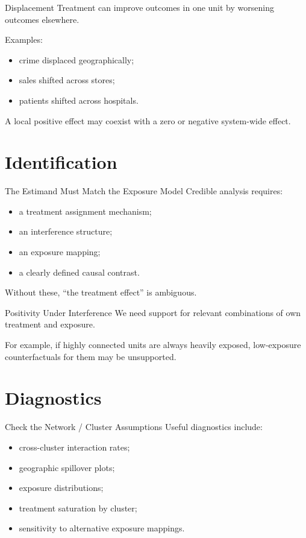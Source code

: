 \documentclass[aspectratio=169,11pt]{beamer}
\begin{document}
\begin{frame}{Displacement}
Treatment can improve outcomes in one unit by worsening outcomes elsewhere.

Examples:
\begin{itemize}
\item crime displaced geographically;
\item sales shifted across stores;
\item patients shifted across hospitals.
\end{itemize}

A local positive effect may coexist with a zero or negative system-wide effect.
\end{frame}

\section{Identification}

\begin{frame}{The Estimand Must Match the Exposure Model}
Credible analysis requires:
\begin{itemize}
\item a treatment assignment mechanism;
\item an interference structure;
\item an exposure mapping;
\item a clearly defined causal contrast.
\end{itemize}

Without these, “the treatment effect” is ambiguous.
\end{frame}

\begin{frame}{Positivity Under Interference}
We need support for relevant combinations of own treatment and exposure.

For example, if highly connected units are always heavily exposed, low-exposure counterfactuals for them may be unsupported.
\end{frame}

\section{Diagnostics}

\begin{frame}{Check the Network / Cluster Assumptions}
Useful diagnostics include:
\begin{itemize}
\item cross-cluster interaction rates;
\item geographic spillover plots;
\item exposure distributions;
\item treatment saturation by cluster;
\item sensitivity to alternative exposure mappings.
\end{itemize}
\end{frame}
\end{document}

